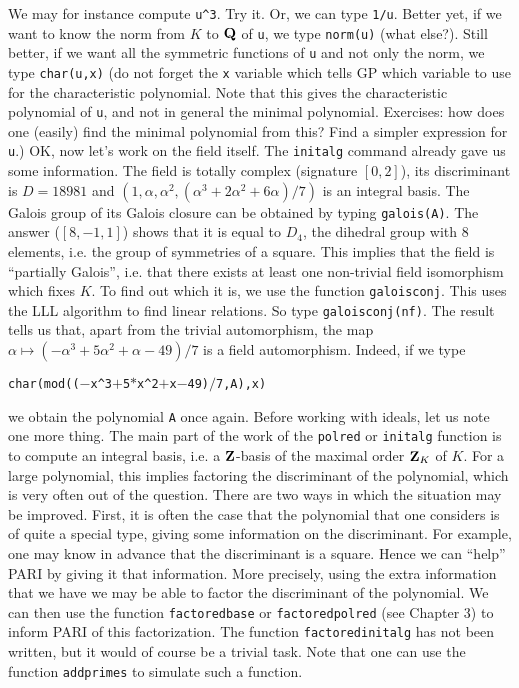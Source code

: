 We may for instance compute {\tt u\^{}3}. Try it. Or, we can type {\tt 1/u}.
Better yet, if we want to know the norm from $K$ to ${\bf Q}$ of {\tt u},
we type {\tt norm(u)} (what else?). Still better, if we want all the
symmetric functions of {\tt u} and not only the norm, we type
{\tt char(u,x)} (do not forget the {\tt x} variable which tells GP which
variable to use for the characteristic polynomial. Note that this gives
the characteristic polynomial of {\tt u}, and not in general the minimal
polynomial. Exercises: how does one (easily) find the minimal polynomial
from this? Find a simpler expression for {\tt u}.)
\smallskip
OK, now let's work on the field itself. The {\tt initalg} command already gave
us some information. The field is totally complex (signature $[0,2]$), its 
discriminant is $D=18981$ and 
$(1,\alpha,\alpha^2,(\alpha^3+2\alpha^2+6\alpha)/7)$ is an integral basis.
The Galois group of its Galois closure can be obtained by typing
{\tt galois(A)}. The answer ($[8,-1,1]$) shows that it is equal to $D_4$, the 
dihedral group with 8 elements, i.e. the group of symmetries of a square. 
\smallskip
This implies that the field is ``partially Galois'', i.e. that there exists at
least one non-trivial field isomorphism which fixes $K$. To find out which it
is, we use the function {\tt galoisconj}. This uses the LLL algorithm to find 
linear relations. So type {\tt galoisconj(nf)}. The result tells us that,
apart from the trivial automorphism, the map
$\alpha\mapsto(-\alpha^3+5\alpha^2+\alpha-49)/7$
is a field automorphism. Indeed, if we type

\centerline{\tt char(mod(($-$x\^{}3$+$5$*$x\^{}2$+$x$-$49)$/$7,A),x)}

we obtain the polynomial {\tt A} once again.
\smallskip
Before working with ideals, let us note one more thing. The main part of the
work of the {\tt polred} or {\tt initalg} function is to compute an integral 
basis, i.e. a ${\bf Z}$-basis of the maximal order ${\bf Z}_K$ of $K$. For a large
polynomial, this implies factoring the discriminant of the polynomial, which
is very often out of the question. There are two ways in which the situation 
may be improved. First, it is often the case that the polynomial that one 
considers is of quite a special type, giving some information on the
discriminant. For example, one may know in advance that the discriminant is a
square. Hence we can ``help'' PARI by giving it that information. More
precisely, using the extra information that we have we may be able to factor
the discriminant of the polynomial. We can then use the function 
{\tt factoredbase} or {\tt factoredpolred} (see Chapter 3)
to inform PARI of this factorization. The function {\tt factoredinitalg} 
has not been written, but it would of course be a trivial task. Note that
one can use the function {\tt addprimes} to simulate such a function.

